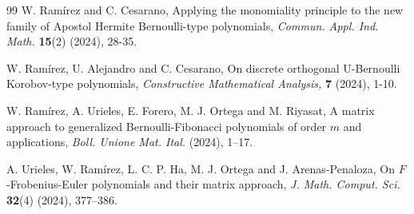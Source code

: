 \documentclass[12pt, a4paper]{article}
\theoremstyle{definition}
\numberwithin{equation}{section}
\begin{document}
\begin{thebibliography}{99}
W. Ram\'irez and C. Cesarano, Applying the monomiality principle to the new family of Apostol Hermite Bernoulli-type polynomials, \textit{Commun. Appl. Ind. Math.} \textbf{15}(2) (2024), 28-35.

W. Ram\'irez, U. Alejandro and C. Cesarano, On discrete orthogonal U-Bernoulli Korobov-type polynomials, \textit{Constructive Mathematical Analysis,} \textbf{7} (2024), 1-10.

W. Ram\'irez, A. Urieles, E. Forero, M. J. Ortega and M. Riyasat, A matrix approach to generalized Bernoulli-Fibonacci polynomials of order $m$ and applications, \textit{Boll. Unione Mat. Ital.} (2024), 1–17.

A. Urieles, W. Ram\'irez, L. C. P. Ha, M. J. Ortega and J. Arenas-Penaloza, On $F$-Frobenius-Euler polynomials and their matrix approach, \textit{J. Math. Comput. Sci.} \textbf{32}(4) (2024), 377–386.

\end{thebibliography}
\end{document}
